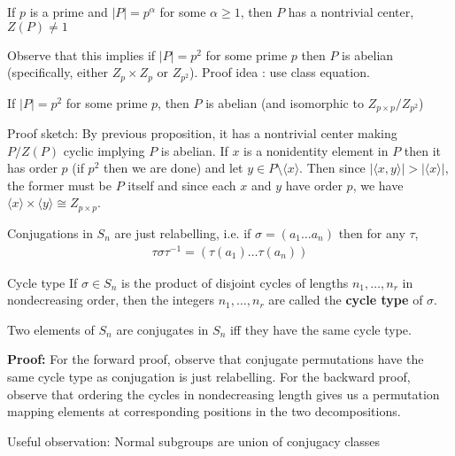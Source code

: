 \documentclass[titlepage, 12pt]{article}
\begin{document}
\begin{theorem}{}{}
    If $p$ is a prime and $|P| = p^\alpha$ for some $\alpha\geq 1$, then $P$ has
    a nontrivial center, $Z(P)\neq 1$
\end{theorem}
Observe that this implies if $|P| = p^2$ for some prime $p$ then $P$ is abelian
(specifically, either $Z_p\times Z_p$ or $Z_{p^2}$). Proof idea : use class
equation.

\begin{proposition}{}{}
    If $|P| = p^2$ for some prime $p$, then $P$ is abelian (and isomorphic to
    $Z_{p\times p}/Z_{p^2}$)
\end{proposition}
Proof sketch: By previous proposition, it has a nontrivial center making
$P/Z(P)$ cyclic implying $P$ is abelian. If $x$ is a nonidentity element in $P$
then it has order $p$ (if $p^2$ then we are done) and let $y\in P \setminus
\langle x\rangle$. Then since $|\langle x, y\rangle | > |\langle x\rangle |$,
the former must be $P$ itself and since each $x$ and $y$ have order $p$, we have
$\langle x\rangle \times \langle y\rangle\cong Z_{p\times p}$.

\begin{proposition}{}{}
    Conjugations in $S_n$ are just relabelling, i.e. if $\sigma = (a_1\dots
    a_n)$ then for any $\tau$,
    \begin{gather*}
        \tau\sigma\tau^{-1} = (\tau(a_1)\dots\tau(a_n))
    \end{gather*}
\end{proposition}

\begin{definition}{Cycle type}{}
    If $\sigma\in S_n$ is the product of disjoint cycles of lengths
    $n_1,\dots,n_r$ in nondecreasing order, then the integers $n_1,\dots,n_r$
    are called the \textbf{cycle type} of $\sigma$.
\end{definition}

\begin{proposition}{}{}
    Two elements of $S_n$ are conjugates in $S_n$ iff they have the same cycle
    type.
\end{proposition}
\textbf{Proof:} For the forward proof, observe that conjugate permutations have
the same cycle type as conjugation is just relabelling. For the backward proof,
observe that ordering the cycles in nondecreasing length gives us a permutation
mapping elements at corresponding positions in the two decompositions.

Useful observation: Normal subgroups are union of conjugacy classes
\end{document}
